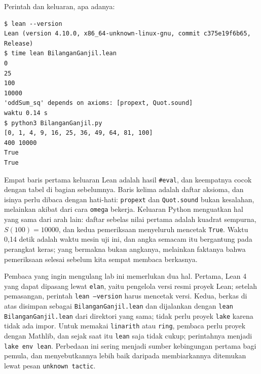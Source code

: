 Perintah dan keluaran, apa adanya:

\begin{verbatim}
$ lean --version
Lean (version 4.10.0, x86_64-unknown-linux-gnu, commit c375e19f6b65, Release)
$ time lean BilanganGanjil.lean
0
25
100
10000
'oddSum_sq' depends on axioms: [propext, Quot.sound]
waktu 0.14 s
$ python3 BilanganGanjil.py
[0, 1, 4, 9, 16, 25, 36, 49, 64, 81, 100]
400 10000
True
True
\end{verbatim}

Empat baris pertama keluaran Lean adalah hasil \texttt{\#eval}, dan keempatnya cocok dengan tabel
di bagian sebelumnya. Baris kelima adalah daftar aksioma, dan isinya perlu dibaca dengan hati-hati:
\texttt{propext} dan \texttt{Quot.sound} bukan kesalahan, melainkan akibat dari cara
\texttt{omega} bekerja. Keluaran Python menguatkan hal yang sama dari arah lain: daftar sebelas
nilai pertama adalah kuadrat sempurna, $S(100)=10000$, dan kedua pemeriksaan menyeluruh mencetak
\texttt{True}. Waktu 0,14 detik adalah waktu mesin uji ini, dan angka semacam itu bergantung pada
perangkat keras; yang bermakna bukan angkanya, melainkan faktanya bahwa pemeriksaan selesai
sebelum kita sempat membaca berkasnya.

Pembaca yang ingin mengulang lab ini memerlukan dua hal. Pertama, Lean 4 yang dapat dipasang
lewat \texttt{elan}, yaitu pengelola versi resmi proyek Lean; setelah pemasangan, perintah
\texttt{lean --version} harus mencetak versi. Kedua, berkas di atas disimpan sebagai
\texttt{BilanganGanjil.lean} dan dijalankan dengan \texttt{lean BilanganGanjil.lean} dari direktori
yang sama; tidak perlu proyek \texttt{lake} karena tidak ada impor. Untuk memakai \texttt{linarith}
atau \texttt{ring}, pembaca perlu proyek dengan Mathlib, dan sejak saat itu \texttt{lean} saja
tidak cukup; perintahnya menjadi \texttt{lake env lean}. Perbedaan ini sering menjadi sumber
kebingungan pertama bagi pemula, dan menyebutkannya lebih baik daripada membiarkannya ditemukan
lewat pesan \texttt{unknown tactic}.

